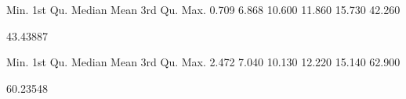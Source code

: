 \begin{Schunk}
\begin{Soutput}
   Min. 1st Qu.  Median    Mean 3rd Qu.    Max. 
  0.709   6.868  10.600  11.860  15.730  42.260 
\end{Soutput}
\begin{Soutput}
[1] 43.43887
\end{Soutput}
\begin{Soutput}
   Min. 1st Qu.  Median    Mean 3rd Qu.    Max. 
  2.472   7.040  10.130  12.220  15.140  62.900 
\end{Soutput}
\begin{Soutput}
[1] 60.23548
\end{Soutput}
\end{Schunk}
